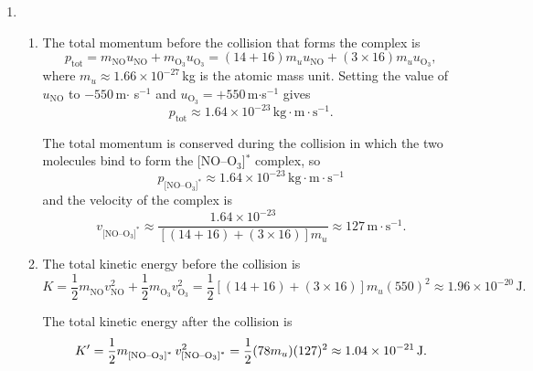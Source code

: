 \documentclass[12pt]{article}
\begin{document}
\begin{enumerate}
  \item
    \begin{enumerate}

      \item The total momentum before the collision that forms the
        complex is
        \begin{displaymath}
          p_{\text{tot}} = m_{\text{NO}} u_{\text{NO}} + m_{\text{O}_3}
          u_{\text{O}_3} = (14 + 16)m_u u_{\text{NO}} + (3\times 16)m_u u_{\text{O}_3},
        \end{displaymath}
        where $m_u \approx 1.66 \times 10^{-27}\,$kg is the atomic mass
        unit. Setting the value of $u_{\text{NO}}$ to $-550\,$m$\cdot$
        s$^{-1}$ and $u_{\text{O}_3} = +550\,$m$\cdot$s$^{-1}$ gives
        \begin{displaymath}
          p_{\text{tot}} \approx 1.64 \times 10^{-23}\,\text{kg}\cdot\text{m}\cdot\text{s}^{-1}.
        \end{displaymath}

        The total momentum is conserved during the collision in which
        the two molecules bind to form the [NO--O$_3$]$^{\ast}$ complex,
        so
        \begin{displaymath}
          p_{\text{[NO--O$_3$]}^{\ast}} \approx 1.64 \times
          10^{-23}\,\text{kg}\cdot\text{m}\cdot\text{s}^{-1}
        \end{displaymath}
        and the velocity of the complex is
        \begin{displaymath}
          v_{\text{[NO--O$_3$]}^{\ast}} \approx \frac{1.64 \times
            10^{-23}}{[(14 + 16) + (3 \times 16)] m_u} \approx
          127\,\text{m}\cdot\text{s}^{-1}.
        \end{displaymath}

      \item The total kinetic energy before the collision is
        \[
          K = \frac{1}{2} m^{}_{\text{NO}}v_{\text{NO}}^2 + \frac{1}{2}
              m^{}_{\text{O}_3} v_{\text{O}_3}^2 
            = \frac{1}{2} [ (14 + 16) + (3 \times 16) ] m_u (550)^2 
            \approx 1.96\times 10^{-20}\,\text{J}.
          \]

        The total kinetic energy after the collision is
        \[
          K' = \frac{1}{2} m^{}_{\text{[NO--O$_3$]}^{\ast}} \,
               v_{\text{[NO--O$_{3}$]}^{\ast}}^2 \\
             = \frac{1}{2} (78 m_u) (127)^2 \\
             \approx 1.04 \times 10^{-21}\,\text{J}.
        \]


\end{enumerate}
\end{enumerate}
\end{document}
